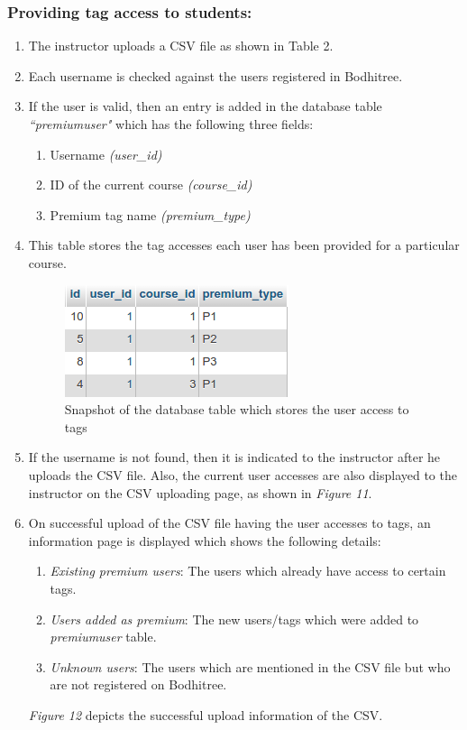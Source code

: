 \newpage

\subsubsection*{Providing tag access to students:}

\begin{enumerate}
	\item The instructor uploads a CSV file as shown in Table 2.
	\item Each username is checked against the users registered in Bodhitree.
	\item If the user is valid, then an entry is added in the database table \textit{``premiumuser"} which has the following three fields:
	\begin{enumerate}
		\item Username \textit{(user\_id)}
		\item ID of the current course \textit{(course\_id)}
		\item Premium tag name \textit{(premium\_type)}
	\end{enumerate}
	\item This table stores the tag accesses each user has been provided for a particular course.
	
	\begin{figure}[h]
	\centering
	\includegraphics[width=0.4\linewidth]{./media/premiumAccesses}
	\caption{Snapshot of the database table which stores the user access to tags}
	\label{fig:premiumAccesses}
	\end{figure}
	
	\item If the username is not found, then it is indicated to the instructor after he uploads the CSV file. Also, the current user accesses are also displayed to the instructor on the CSV uploading page, as shown in \textit{Figure 11}.
	
	\item On successful upload of the CSV file having the user accesses to tags, an information page is displayed which shows the following details:
	
	\begin{enumerate}
		\item \textit{Existing premium users}: The users which already have access to certain tags.
		\item \textit{Users added as premium}: The new users/tags which were added to \textit{premiumuser} table.
		\item \textit{Unknown users}: The users which are mentioned in the CSV file but who are not registered on Bodhitree.
	\end{enumerate}
		
	\textit{Figure 12} depicts the successful upload information of the CSV.
	
\end{enumerate}

